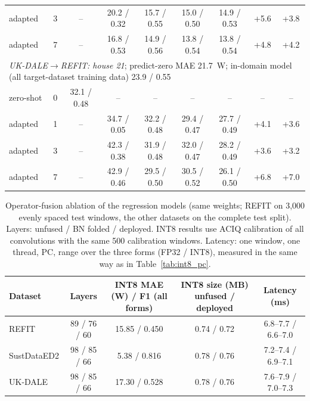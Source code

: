 \begin{table}[H]
\begin{tabular}{@{}lcccccccc@{}}
adapted & 3 & -- & 20.2 / 0.32 & 15.7 / 0.55 & 15.0 / 0.50 & 14.9 / 0.53 & +5.6 & +3.8 \\
adapted & 7 & -- & 16.8 / 0.53 & 14.9 / 0.56 & 13.8 / 0.54 & 13.8 / 0.54 & +4.8 & +4.2 \\
\midrule
\multicolumn{9}{l}{\textit{UK-DALE$\rightarrow$REFIT: house 21}; predict-zero MAE 21.7~W; in-domain model (all target-dataset training data) 23.9 / 0.55} \\
zero-shot & 0 & 32.1 / 0.48 & -- & -- & -- & -- & -- & -- \\
adapted & 1 & -- & 34.7 / 0.05 & 32.2 / 0.48 & 29.4 / 0.47 & 27.7 / 0.49 & +4.1 & +3.6 \\
adapted & 3 & -- & 42.3 / 0.38 & 31.9 / 0.48 & 32.0 / 0.47 & 28.2 / 0.49 & +3.6 & +3.2 \\
adapted & 7 & -- & 42.9 / 0.46 & 29.5 / 0.50 & 30.5 / 0.52 & 26.1 / 0.50 & +6.8 & +7.0 \\
\bottomrule
\end{tabular}
\end{table}

\begin{table}[H]
\centering
\caption{Operator-fusion ablation of the regression models (same weights; REFIT on 3{,}000 evenly spaced test windows, the other datasets on the complete test split). Layers: unfused / BN folded / deployed. INT8 results use ACIQ calibration of all convolutions with the same 500 calibration windows. Latency: one window, one thread, PC, range over the three forms (FP32 / INT8), measured in the same way as in Table~\ref{tab:int8_pc}.}
\label{tab:fusion}
\footnotesize
\begin{tabular}{@{}lcccc@{}}
\toprule
Dataset & Layers & INT8 MAE (W) / F1 (all forms) & INT8 size (MB) unfused / deployed & Latency (ms) \\
\midrule
REFIT & 89 / 76 / 60 & 15.85 / 0.450 & 0.74 / 0.72 & 6.8--7.7 / 6.6--7.0 \\
SustDataED2 & 98 / 85 / 66 & 5.38 / 0.816 & 0.78 / 0.76 & 7.2--7.4 / 6.9--7.1 \\
UK-DALE & 98 / 85 / 66 & 17.30 / 0.528 & 0.78 / 0.76 & 7.6--7.9 / 7.0--7.3 \\
\bottomrule
\end{tabular}
\end{table}


